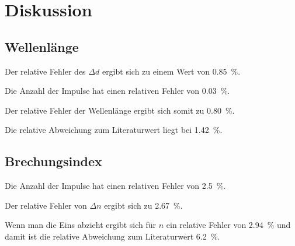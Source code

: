 \section{Diskussion}
\label{sec:Diskussion}

\subsection{Wellenlänge}

Der relative Fehler des $\Delta d$ ergibt sich zu einem Wert von \SI{0.85}{\percent}. 

Die Anzahl der Impulse hat einen relativen Fehler von \SI{0.03}{\percent}. 

Der relative Fehler der Wellenlänge ergibt sich somit zu \SI{0.80}{\percent}. 

Die relative Abweichung zum Literaturwert liegt bei 
\SI{1.42}{\percent}.

\subsection{Brechungsindex}

Die Anzahl der Impulse hat einen relativen Fehler von \SI{2.5}{\percent}. 

Der relative Fehler von $\Delta n$ ergibt sich zu \SI{2.67}{\percent}.

Wenn man die Eins abzieht ergibt sich für $n$ ein relative Fehler von \SI{2.94}{\percent} und damit ist die relative Abweichung zum Literaturwert \SI{6.2}{\percent}. 
